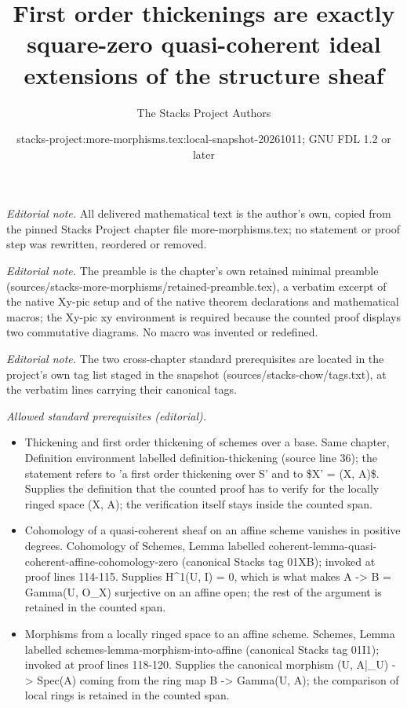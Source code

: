 \documentclass[10pt,a4paper]{amsart}
\title{First order thickenings are exactly square-zero quasi-coherent ideal extensions of the structure sheaf}
\author{The Stacks Project Authors}
\date{stacks-project:more-morphisms.tex:local-snapshot-20261011; GNU FDL 1.2 or later}
\theoremstyle{plain}
\theoremstyle{definition}
\theoremstyle{remark}
\numberwithin{equation}{subsection}
\begin{document}
\maketitle
\noindent\textit{Editorial note.} All delivered mathematical text is the author's own, copied from the pinned Stacks Project chapter file more-morphisms.tex; no statement or proof step was rewritten, reordered or removed.\par\medskip
\noindent\textit{Editorial note.} The preamble is the chapter's own retained minimal preamble (sources/stacks-more-morphisms/retained-preamble.tex), a verbatim excerpt of the native Xy-pic setup and of the native theorem declarations and mathematical macros; the Xy-pic xy environment is required because the counted proof displays two commutative diagrams. No macro was invented or redefined.\par\medskip
\noindent\textit{Editorial note.} The two cross-chapter standard prerequisites are located in the project's own tag list staged in the snapshot (sources/stacks-chow/tags.txt), at the verbatim lines carrying their canonical tags.\par\medskip
\noindent\textit{Allowed standard prerequisites (editorial).}\begin{itemize}
\item Thickening and first order thickening of schemes over a base. Same chapter, Definition environment labelled definition-thickening (source line 36); the statement refers to 'a first order thickening over S' and to \$X' = (X, A)\$. Supplies the definition that the counted proof has to verify for the locally ringed space (X, A); the verification itself stays inside the counted span.
\item Cohomology of a quasi-coherent sheaf on an affine scheme vanishes in positive degrees. Cohomology of Schemes, Lemma labelled coherent-lemma-quasi-coherent-affine-cohomology-zero (canonical Stacks tag 01XB); invoked at proof lines 114-115. Supplies H\textasciicircum{}1(U, I) = 0, which is what makes A -> B = Gamma(U, O\_X) surjective on an affine open; the rest of the argument is retained in the counted span.
\item Morphisms from a locally ringed space to an affine scheme. Schemes, Lemma labelled schemes-lemma-morphism-into-affine (canonical Stacks tag 01I1); invoked at proof lines 118-120. Supplies the canonical morphism (U, A|\_U) -> Spec(A) coming from the ring map B -> Gamma(U, A); the comparison of local rings is retained in the counted span.
\end{itemize}\medskip
\end{document}
